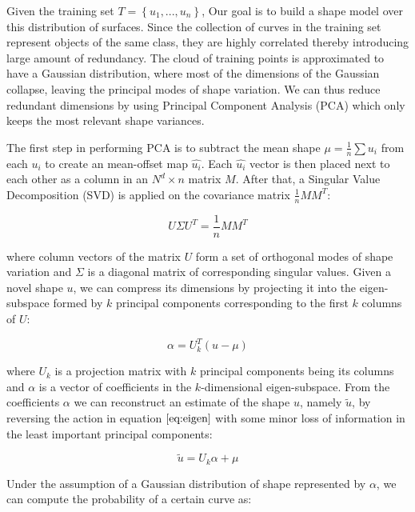 \documentclass{SMBV12}
\begin{document}
Given the training set $T = \left\lbrace u_1, ..., u_n \right\rbrace$, Our goal is to build a shape model over this distribution of surfaces. Since the collection of curves in the training set represent objects of the same class, they are highly correlated thereby introducing large amount of redundancy. The cloud of training points is approximated to have a Gaussian distribution, where most of the dimensions of the Gaussian collapse, leaving the principal modes of shape variation. We can thus reduce redundant dimensions by using Principal Component Analysis (PCA) which only keeps the most relevant shape variances.

The first step in performing PCA is to subtract the mean shape $\mu = \frac{1}{n} \sum u_i$ from each $u_i$ to create an mean-offset map $\hat{u_i}$. Each $\hat{u_i}$ vector is then placed next to each other as a column in an $N^d \times n$ matrix $M$. After that, a Singular Value Decomposition (SVD) is applied on the covariance matrix $\frac{1}{n} MM^T$:

\begin{equation}
U \Sigma U^T = \frac{1}{n}MM^T
\end{equation}

where column vectors of the matrix $U$ form a set of orthogonal modes of shape variation and $\Sigma$ is a diagonal matrix of corresponding singular values. Given a novel shape $u$, we can compress its dimensions by projecting it into the eigen-subspace formed by $k$ principal components corresponding to the first $k$ columns of $U$:

\begin{equation}
\alpha = U^T_k(u - \mu)
\label{eq:eigen}
\end{equation}

where $U_k$ is a projection matrix with $k$ principal components being its columns and $\alpha$ is a vector of coefficients in the $k$-dimensional eigen-subspace. From the coefficients $\alpha$ we can reconstruct an estimate of the shape $u$, namely $\tilde{u}$, by reversing the action in equation $\ref{eq:eigen}$ with some minor loss of information in the least important principal components:

\begin{equation}
\tilde{u} = U_k\alpha + \mu
\end{equation}

Under the assumption of a Gaussian distribution of shape represented by $\alpha$, we can compute the probability of a certain curve as:
\end{document}
